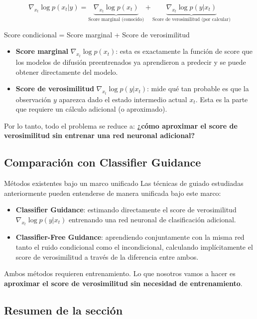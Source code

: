 \documentclass[a4paper]{article}
\begin{document}
$$
\nabla_{x_t} \log p(x_t | y) = \underbrace{\nabla_{x_t} \log p(x_t)}_{\text{Score marginal (conocido)}} + \underbrace{\nabla_{x_t} \log p(y | x_t)}_{\text{Score de verosimilitud (por calcular)}}
$$

\begin{importantbox}{Score condicional = Score marginal + Score de verosimilitud}
\begin{itemize}
    \item \textbf{Score marginal} $\nabla_{x_t} \log p(x_t)$: esta es exactamente la función de score que los modelos de difusión preentrenados ya aprendieron a predecir y se puede obtener directamente del modelo.
    \item \textbf{Score de verosimilitud} $\nabla_{x_t} \log p(y | x_t)$: mide qué tan probable es que la observación $y$ aparezca dado el estado intermedio actual $x_t$. Esta es la parte que requiere un cálculo adicional (o aproximado).
\end{itemize}
Por lo tanto, todo el problema se reduce a: \textbf{¿cómo aproximar el score de verosimilitud sin entrenar una red neuronal adicional?}
\end{importantbox}

\subsection{Comparación con Classifier Guidance}

\begin{knowledgebox}{Métodos existentes bajo un marco unificado}
Las técnicas de guiado estudiadas anteriormente pueden entenderse de manera unificada bajo este marco:
\begin{itemize}
    \item \textbf{Classifier Guidance}: estimando directamente el score de verosimilitud $\nabla_{x_t} \log p(y | x_t)$ entrenando una red neuronal de clasificación adicional.
    \item \textbf{Classifier-Free Guidance}: aprendiendo conjuntamente con la misma red tanto el ruido condicional como el incondicional, calculando implícitamente el score de verosimilitud a través de la diferencia entre ambos.
\end{itemize}
Ambos métodos requieren entrenamiento. Lo que nosotros vamos a hacer es \textbf{aproximar el score de verosimilitud sin necesidad de entrenamiento}.
\end{knowledgebox}

\subsection{Resumen de la sección}
\end{document}
